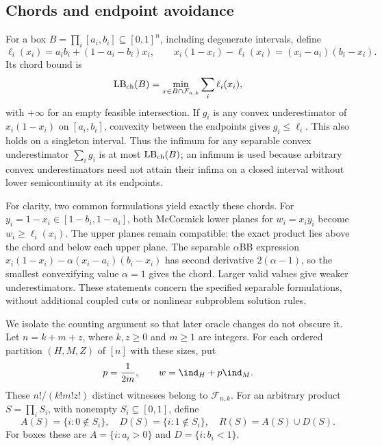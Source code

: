 \subsection{Chords and endpoint avoidance}
For a box $B=\prod_i[a_i,b_i]\subseteq[0,1]^n$, including degenerate
intervals, define
\begin{equation}\label{eq:cardinality-chord}
 \ell_i(x_i)=a_ib_i+(1-a_i-b_i)x_i,\qquad
 x_i(1-x_i)-\ell_i(x_i)=(x_i-a_i)(b_i-x_i).
\end{equation}
Its chord bound is
\[
 \operatorname{LB}_{\rm ch}(B)=
 \min_{x\in B\cap\mathcal F_{n,k}}\sum_i\ell_i(x_i),
\]
with $+\infty$ for an empty feasible intersection. If $g_i$ is any convex
underestimator of $x_i(1-x_i)$ on $[a_i,b_i]$, convexity between the
endpoints gives $g_i\le\ell_i$. This also holds on a singleton interval.
Thus the infimum for any separable convex underestimator $\sum_i g_i$
is at most $\operatorname{LB}_{\rm ch}(B)$; an infimum is used because
arbitrary convex underestimators need not attain their infima on a closed
interval without lower semicontinuity at its endpoints.

For clarity, two common formulations yield exactly these chords. For
$y_i=1-x_i\in[1-b_i,1-a_i]$, both McCormick lower planes for
$w_i=x_iy_i$ become $w_i\ge\ell_i(x_i)$. The upper planes remain
compatible: the exact product lies above the chord and below each upper
plane. The separable $\alpha$BB expression
$x_i(1-x_i)-\alpha(x_i-a_i)(b_i-x_i)$ has second derivative
$2(\alpha-1)$, so the smallest convexifying value $\alpha=1$ gives the
chord. Larger valid values give weaker underestimators. These statements
concern the specified separable formulations, without additional coupled
cuts or nonlinear subproblem solution rules.

We isolate the counting argument so that later oracle changes do not
obscure it. Let $n=k+m+z$, where $k,z\ge0$ and $m\ge1$ are integers.
For each ordered partition $(H,M,Z)$ of $[n]$ with these sizes, put
\begin{equation}\label{eq:cardinality-witness}
 p=\frac1{2m},\qquad w=\ind_H+p\ind_M.
\end{equation}
These $n!/(k!m!z!)$ distinct witnesses belong to $\mathcal F_{n,k}$.
For an arbitrary product $S=\prod_i S_i$, with nonempty
$S_i\subseteq[0,1]$, define
\begin{equation}\label{eq:endpoint-exclusions}
 A(S)=\{i:0\notin S_i\},\quad D(S)=\{i:1\notin S_i\},\quad
 R(S)=A(S)\cup D(S).
\end{equation}
For boxes these are $A=\{i:a_i>0\}$ and $D=\{i:b_i<1\}$.

